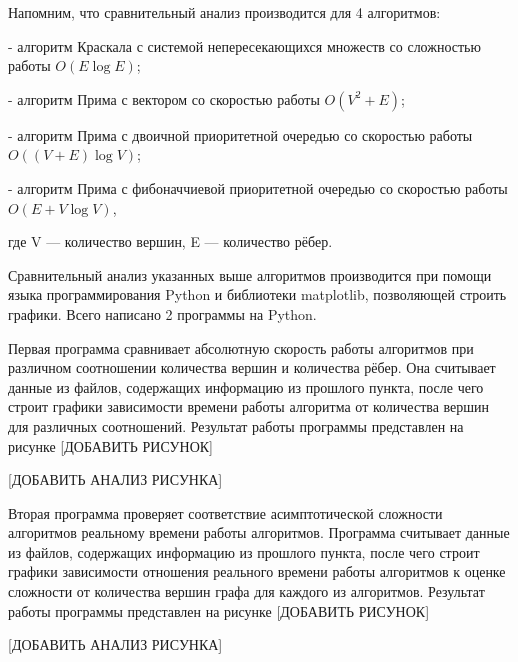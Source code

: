 	\hspace{0.5 cm}
	
	Напомним, что сравнительный анализ производится для 4 алгоритмов:
	
	- алгоритм Краскала с системой непересекающихся множеств со сложностью работы $O(E \log E)$;
	
	- алгоритм Прима с вектором со скоростью работы $O(V^2 + E)$;
	
	- алгоритм Прима с двоичной приоритетной очередью со скоростью работы $O((V + E) \log V)$;
	
	- алгоритм Прима с фибоначчиевой приоритетной очередью со скоростью работы $O(E + V \log V)$,
	
	где V — количество вершин, E — количество рёбер.
	
	Сравнительный анализ указанных выше алгоритмов производится при помощи языка программирования Python и библиотеки matplotlib, позволяющей строить графики. Всего написано 2 программы на Python.
	
	Первая программа сравнивает абсолютную скорость работы алгоритмов при различном соотношении количества вершин и количества рёбер. Она считывает данные из файлов, содержащих информацию из прошлого пункта, после чего строит графики зависимости времени работы алгоритма от количества вершин для различных соотношений. Результат работы программы представлен на рисунке [ДОБАВИТЬ РИСУНОК]
	
	
	[ДОБАВИТЬ АНАЛИЗ РИСУНКА]
	
	Вторая программа проверяет соответствие асимптотической сложности алгоритмов реальному времени работы алгоритмов. Программа считывает данные из файлов, содержащих информацию из прошлого пункта, после чего строит графики зависимости отношения реального времени работы алгоритмов к оценке сложности от количества вершин графа для каждого из алгоритмов. Результат работы программы представлен на рисунке [ДОБАВИТЬ РИСУНОК]
	
	
	[ДОБАВИТЬ АНАЛИЗ РИСУНКА]
	
